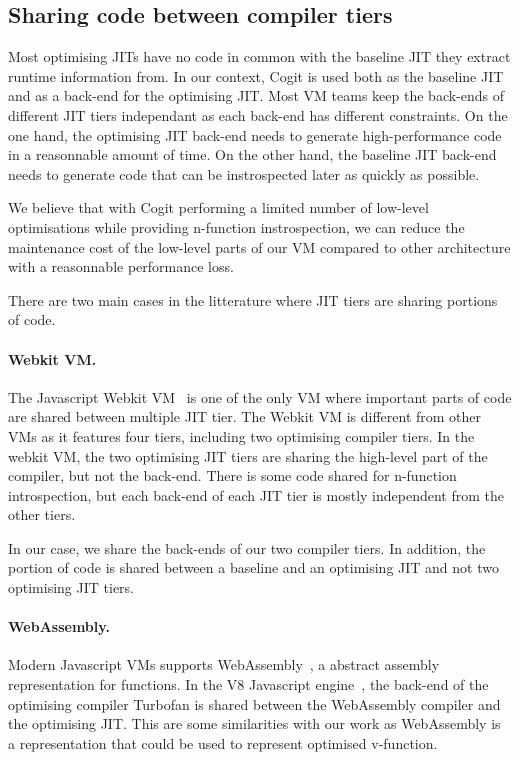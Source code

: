 \documentclass[a4paper,12pt,twoside]{../includes/ThesisStyle}
\begin{document}
\subsection{Sharing code between compiler tiers}
\label{sec:codeSharing}

Most optimising JITs have no code in common with the baseline JIT they extract runtime information from. In our context, Cogit is used both as the baseline JIT and as a back-end for the optimising JIT. Most VM teams keep the back-ends of different JIT tiers independant as each back-end has different constraints. On the one hand, the optimising JIT back-end needs to generate high-performance code in a reasonnable amount of time. On the other hand, the baseline JIT back-end needs to generate code that can be instrospected later as quickly as possible. 

We believe that with Cogit performing a limited number of low-level optimisations while providing n-function instrospection, we can reduce the maintenance cost of the low-level parts of our VM compared to other architecture with a reasonnable performance loss. 

There are two main cases in the litterature where JIT tiers are sharing portions of code.

\paragraph{Webkit VM.}The Javascript Webkit VM~\cite{Webkit15} is one of the only VM where important parts of code are shared between multiple JIT tier. The Webkit VM is different from other VMs as it features four tiers, including two optimising compiler tiers. In the webkit VM, the two optimising JIT tiers are sharing the high-level part of the compiler, but not the back-end. There is some code shared for n-function introspection, but each back-end of each JIT tier is mostly independent from the other tiers.

In our case, we share the back-ends of our two compiler tiers. In addition, the portion of code is shared between a baseline and an optimising JIT and not two optimising JIT tiers.

\paragraph{WebAssembly.}Modern Javascript VMs supports WebAssembly~\cite{WebAssembly}, a abstract assembly representation for functions. In the V8 Javascript engine~\cite{V8}, the back-end of the optimising compiler Turbofan is shared between the WebAssembly compiler and the optimising JIT. This are some similarities with our work as WebAssembly is a representation that could be used to represent optimised v-function. 
\end{document}
